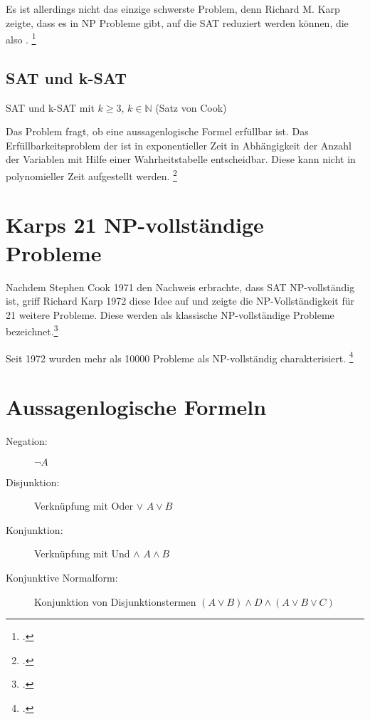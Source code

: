 \documentclass{lehramt-informatik-haupt}
\begin{document}
Es ist allerdings nicht das einzige schwerste Problem, denn Richard M.
Karp zeigte, dass es in NP Probleme gibt, auf die SAT reduziert werden
können, die also .
\footcite[Seite 70]{theo:fs:4}

\subsection{SAT und k-SAT}

SAT und k-SAT mit $k \geq 3$, $k \in \mathbb{N}$ (Satz von Cook)

Das Problem fragt, ob eine aussagenlogische Formel erfüllbar ist. Das
Erfüllbarkeitsproblem der  ist in exponentieller
Zeit in Abhängigkeit der Anzahl der Variablen mit Hilfe einer
Wahrheitstabelle entscheidbar. Diese  kann nicht
in polynomieller Zeit aufgestellt werden.
\footcite[Seite 71]{theo:fs:4}

\section{Karps 21 NP-vollständige Probleme}

Nachdem Stephen Cook 1971 den Nachweis erbrachte, dass SAT
NP-vollständig ist, griff Richard Karp 1972 diese Idee auf und zeigte
die NP-Vollständigkeit für 21 weitere Probleme. Diese werden als
klassische NP-vollständige Probleme bezeichnet.\footcite{wiki:karps-21}

Seit 1972 wurden mehr als 10000 Probleme als NP-vollständig
charakterisiert.
\footcite[Seite 80]{theo:fs:4}

\section{Aussagenlogische Formeln}

\begin{description}
\item[Negation:]

$\neg A$

\item[Disjunktion:]

Verknüpfung mit Oder $\lor$
$A \lor B$

\item[Konjunktion:]

Verknüpfung mit Und $\land$
$A \land B$

\item[Konjunktive Normalform:]
Konjunktion von Disjunktionstermen
$(A \lor B) \land D \land (A \lor B \lor C)$
\end{description}
\end{document}
